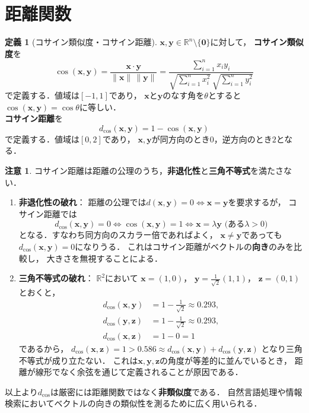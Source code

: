 \documentclass[dvipdfmx,a4paper,12pt]{jsarticle}
\theoremstyle{definition}
\newtheorem{definition}[theorem]{定義}
\newtheorem{remark}[theorem]{注意}
\begin{document}
\section{距離関数}

\begin{definition}[コサイン類似度・コサイン距離]
    $\bm{x},\bm{y}\in\mathbb{R}^n\setminus\{\bm{0}\}$に対して，
    \textbf{コサイン類似度}を
    $$\cos(\bm{x},\bm{y})
    =\frac{\bm{x}\cdot\bm{y}}{\|\bm{x}\|\,\|\bm{y}\|}
    =\frac{\sum_{i=1}^n x_i y_i}
    {\sqrt{\sum_{i=1}^n x_i^2}\,\sqrt{\sum_{i=1}^n y_i^2}}$$
    で定義する．値域は$[-1,1]$であり，
    $\bm{x}$と$\bm{y}$のなす角を$\theta$とすると
    $\cos(\bm{x},\bm{y})=\cos\theta$に等しい．\\
    \textbf{コサイン距離}を
    $$d_{\cos}(\bm{x},\bm{y})=1-\cos(\bm{x},\bm{y})$$
    で定義する．値域は$[0,2]$であり，
    $\bm{x},\bm{y}$が同方向のとき$0$，逆方向のとき$2$となる．
\end{definition}

\begin{remark}
    コサイン距離は距離の公理のうち，\textbf{非退化性}と\textbf{三角不等式}を満たさない．
    \begin{enumerate}
        \item \textbf{非退化性の破れ}：
        距離の公理では$d(\bm{x},\bm{y})=0\Leftrightarrow\bm{x}=\bm{y}$を要求するが，
        コサイン距離では
        $$d_{\cos}(\bm{x},\bm{y})=0
        \iff\cos(\bm{x},\bm{y})=1
        \iff\bm{x}=\lambda\bm{y}\text{ (ある}\lambda>0\text{)}$$
        となる．すなわち同方向のスカラー倍であればよく，
        $\bm{x}\neq\bm{y}$であっても$d_{\cos}(\bm{x},\bm{y})=0$になりうる．
        これはコサイン距離がベクトルの\textbf{向き}のみを比較し，
        大きさを無視することによる．
        \item \textbf{三角不等式の破れ}：
        $\mathbb{R}^2$において
        $\bm{x}=(1,0)$，
        $\bm{y}=\tfrac{1}{\sqrt{2}}(1,1)$，
        $\bm{z}=(0,1)$とおくと，
        \begin{align*}
            d_{\cos}(\bm{x},\bm{y})&=1-\tfrac{1}{\sqrt{2}}\approx 0.293,\\
            d_{\cos}(\bm{y},\bm{z})&=1-\tfrac{1}{\sqrt{2}}\approx 0.293,\\
            d_{\cos}(\bm{x},\bm{z})&=1-0=1
        \end{align*}
        であるから，
        $d_{\cos}(\bm{x},\bm{z})=1>0.586\approx
        d_{\cos}(\bm{x},\bm{y})+d_{\cos}(\bm{y},\bm{z})$
        となり三角不等式が成り立たない．
        これは$\bm{x},\bm{y},\bm{z}$の角度が等差的に並んでいるとき，
        距離が線形でなく余弦を通じて定義されることが原因である．
    \end{enumerate}
    以上より$d_{\cos}$は厳密には距離関数ではなく\textbf{非類似度}である．
    自然言語処理や情報検索においてベクトルの向きの類似性を測るために広く用いられる．
\end{remark}
\end{document}
